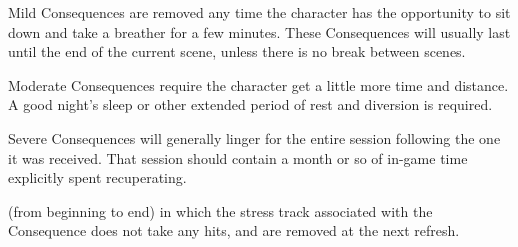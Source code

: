 Mild Consequences are removed any time the character has the opportunity to sit down and take a breather for a few minutes. These Consequences will usually last until the end of the current scene, unless there is no break between scenes.

Moderate Consequences require the character get a little more time and distance. A good night's sleep or other extended period of rest and diversion is required.


Severe Consequences will generally linger for the entire session following the one it was received. That session should contain a month or so of in-game time explicitly spent recuperating.

 (from beginning to end) in which the stress track associated with the Consequence does not take any hits, and are removed at the next refresh.

